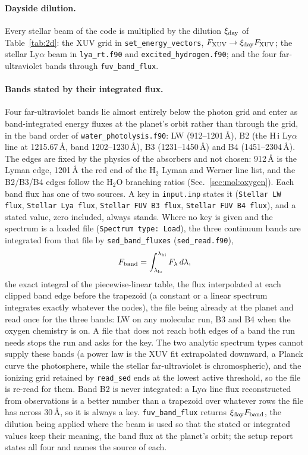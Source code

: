 \paragraph{Dayside dilution.} Every stellar beam of the code is multiplied by
the dilution $\xi_{\rm day}$ of Table~\ref{tab:2d}: the XUV grid in
\texttt{set\_energy\_vectors}, $F_{\rm XUV} \to \xi_{\rm day}F_{\rm XUV}$;
the stellar Ly$\alpha$ beam in \texttt{lya\_rt.f90} and
\texttt{excited\_hydrogen.f90}; and the four far-ultraviolet bands through
\texttt{fuv\_band\_flux}.

\paragraph{Bands stated by their integrated flux.} Four far-ultraviolet
bands lie almost entirely below the photon grid and enter as
band-integrated energy fluxes at the planet's orbit rather than through
the grid, in the band order of \texttt{water\_photolysis.f90}: LW
(912--1201\,\AA), B2 (the H\,{\sc i} Ly$\alpha$ line at 1215.67\,\AA,
band 1202--1230\,\AA), B3 (1231--1450\,\AA) and B4 (1451--2304\,\AA). The
edges are fixed by the physics of the absorbers and not chosen: 912\,\AA{}
is the Lyman edge, 1201\,\AA{} the red end of the H$_2$ Lyman and Werner
line list, and the B2/B3/B4 edges follow the H$_2$O branching ratios
(Sec.~\ref{sec:mol:oxygen}). Each band flux has one of two sources. A key
in \texttt{input.inp} states it (\texttt{Stellar LW flux},
\texttt{Stellar Lya flux}, \texttt{Stellar FUV B3 flux},
\texttt{Stellar FUV B4 flux}), and a stated value, zero included, always
stands. Where no key is given and the spectrum is a loaded file
(\texttt{Spectrum type: Load}), the three continuum bands are integrated
from that file by \texttt{sed\_band\_fluxes} (\texttt{sed\_read.f90}),
\begin{equation}
F_{\rm band} = \int_{\lambda_{\rm lo}}^{\lambda_{\rm hi}} F_\lambda\,d\lambda,
\label{eq:rad:bandflux}
\end{equation}
the exact integral of the piecewise-linear table, the flux interpolated at
each clipped band edge before the trapezoid (a constant or a linear
spectrum integrates exactly whatever the nodes), the file being already at
the planet and read once for the three bands: LW on any molecular run, B3
and B4 when the oxygen chemistry is on. A file that does not reach both
edges of a band the run needs stops the run and asks for the key. The two analytic spectrum types cannot supply these
bands (a power law is the XUV fit extrapolated downward, a Planck curve
the photosphere, while the stellar far-ultraviolet is chromospheric), and
the ionizing grid retained by \texttt{read\_sed} ends at the lowest active
threshold, so the file is re-read for them. Band B2 is never integrated:
a Ly$\alpha$ line flux reconstructed from observations is a better number
than a trapezoid over whatever rows the file has across 30\,\AA, so it is
always a key. \texttt{fuv\_band\_flux} returns $\xi_{\rm day}F_{\rm band}$,
the dilution being applied where the beam is used so that the stated or
integrated values keep their meaning, the band flux at the planet's orbit;
the setup report states all four and names the source of each.

